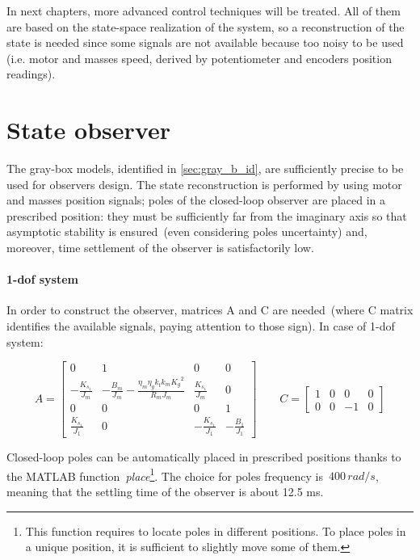 
In next chapters, more advanced control techniques will be treated. All of them are based on the state-space realization of the system, so a reconstruction of the state is needed since some signals are not available because too noisy to be used (i.e. motor and masses speed, derived by potentiometer and encoders position readings).

\section{State observer}

The gray-box models, identified in \cref{sec:gray_b_id}, are sufficiently precise to be used for observers design. The state reconstruction is performed by using motor and masses position signals; poles of the closed-loop observer are placed in a prescribed position: they must be sufficiently far from the imaginary axis so that asymptotic stability is ensured~(even considering poles uncertainty) and, moreover, time settlement of the observer is satisfactorily low.

\paragraph{\acrshort{1-dof} system}

In order to construct the observer, matrices A and C are needed~(where C matrix identifies the available signals, paying attention to those sign). In case of \acrshort{1-dof} system:

\begin{equation}
	A = 
	\begin{bmatrix}
		0 &1 & 0 & 0 \\
		-\frac{K_{s_1}}{J_m} & -\frac{B_m}{J_m}-\frac{\eta_m \eta_g k_t k_m {K_g}^2}{R_m J_m}  & \frac{K_{s_1}}{J_m} & 0 \\
		0 & 0 & 0 & 1 \\
		\frac{K_{s_1}}{J_1} & 0 & -\frac{K_{s_1}}{J_1} & -\frac{B_1}{J_1}
	\end{bmatrix}
	\qquad
	C =
	\begin{bmatrix}
		1 & 0 & 0 & 0 \\
		0 & 0 & -1 & 0
	\end{bmatrix}
\label{eqn:1dof_mat_obs}
\end{equation}

Closed-loop poles can be automatically placed in prescribed positions thanks to the MATLAB function~\textit{place}\footnote{This function requires to locate poles in different positions. To place poles in a unique position, it is sufficient to slightly move some of them.}.
The choice for poles frequency is~$400 \, rad/s$, meaning that the settling time of the observer is about 12.5 ms.

